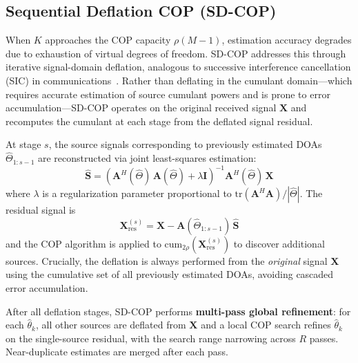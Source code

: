 \documentclass[journal]{IEEEtran}
\newcommand{\mat}[1]{\mathbf{#1}}
\begin{document}
\subsection{Sequential Deflation COP (SD-COP)}
\label{sec:sdcop}

When $K$ approaches the COP capacity $\rho(M-1)$, estimation accuracy degrades due to exhaustion of virtual degrees of freedom. SD-COP addresses this through iterative signal-domain deflation, analogous to successive interference cancellation (SIC) in communications~\cite{andrews2005sic}. Rather than deflating in the cumulant domain---which requires accurate estimation of source cumulant powers and is prone to error accumulation---SD-COP operates on the original received signal $\mat{X}$ and recomputes the cumulant at each stage from the deflated signal residual.

At stage $s$, the source signals corresponding to previously estimated DOAs $\hat{\Theta}_{1:s-1}$ are reconstructed via joint least-squares estimation:
\begin{equation}
\hat{\mat{S}} = \left(\mat{A}^H(\hat{\Theta})\,\mat{A}(\hat{\Theta}) + \lambda\mat{I}\right)^{-1} \mat{A}^H(\hat{\Theta})\,\mat{X}
\label{eq:sdcop_ls}
\end{equation}
where $\lambda$ is a regularization parameter proportional to $\mathrm{tr}(\mat{A}^H\mat{A})/|\hat{\Theta}|$. The residual signal is
\begin{equation}
\mat{X}_{\mathrm{res}}^{(s)} = \mat{X} - \mat{A}(\hat{\Theta}_{1:s-1})\,\hat{\mat{S}}
\label{eq:sdcop_deflation}
\end{equation}
and the COP algorithm is applied to $\mathrm{cum}_{2\rho}(\mat{X}_{\mathrm{res}}^{(s)})$ to discover additional sources. Crucially, the deflation is always performed from the \emph{original} signal $\mat{X}$ using the cumulative set of all previously estimated DOAs, avoiding cascaded error accumulation.

After all deflation stages, SD-COP performs \textbf{multi-pass global refinement}: for each $\hat{\theta}_k$, all other sources are deflated from $\mat{X}$ and a local COP search refines $\hat{\theta}_k$ on the single-source residual, with the search range narrowing across $R$ passes. Near-duplicate estimates are merged after each pass.
\end{document}

